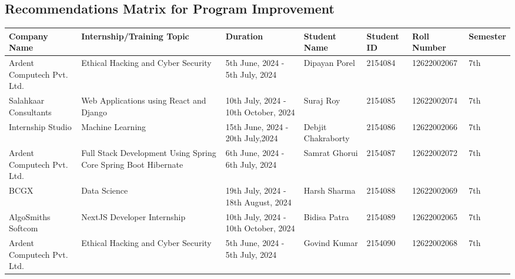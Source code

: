 \documentclass[11pt,a4paper]{article}
\newenvironment{card}{
    \begin{tcolorbox}[
        enhanced,
        colback=cardback,
        colframe=border,
        sharp corners,
        boxrule=0.5pt,
        drop shadow,
        shadow xshift=1mm,
        shadow yshift=-1mm,
        shadow color=border!50,
        boxsep=3mm,
        left=5mm, right=5mm, top=5mm, bottom=5mm,
        width=\textwidth,
        nobeforeafter
    ]
}{\end{tcolorbox}}
\begin{document}
\begin{card}
    \subsection*{\textcolor{accent}{Recommendations Matrix for Program Improvement}}
    \vspace{0.3cm}
    \begin{longtable}{@{}p{}p{}p{}p{}p{}p{}p{}@{}}
        \toprule
        \textbf{Company Name} & \textbf{Internship/Training Topic} & \textbf{Duration} & \textbf{Student Name} & \textbf{Student ID} & \textbf{Roll Number} & \textbf{Semester} \\
        \midrule
        \endhead
        Ardent Computech Pvt. Ltd. & Ethical Hacking and Cyber Security & 5th June, 2024 - 5th July, 2024 & Dipayan Porel & 2154084 & 12622002067 & 7th \\
        Salahkaar Consultants & Web Applications using React and Django & 10th July, 2024 - 10th October, 2024 & Suraj Roy & 2154085 & 12622002074 & 7th \\
        Internship Studio & Machine Learning & 15th June, 2024 - 20th July,2024 & Debjit Chakraborty & 2154086 & 12622002066 & 7th \\
        Ardent Computech Pvt. Ltd. & Full Stack Development Using Spring Core Spring Boot Hibernate & 6th June, 2024 - 6th July, 2024 & Samrat Ghorui & 2154087 & 12622002072 & 7th \\
        BCGX & Data Science & 19th July, 2024 - 18th August, 2024 & Harsh Sharma & 2154088 & 12622002069 & 7th \\
        AlgoSmiths Softcom & NextJS Developer Internship & 10th July, 2024 - 10th October, 2024 & Bidisa Patra & 2154089 & 12622002065 & 7th \\
        Ardent Computech Pvt. Ltd. & Ethical Hacking and Cyber Security & 5th June, 2024 - 5th July, 2024 & Govind Kumar & 2154090 & 12622002068 & 7th \\
        \bottomrule
    \end{longtable}
\end{card}
\end{document}
